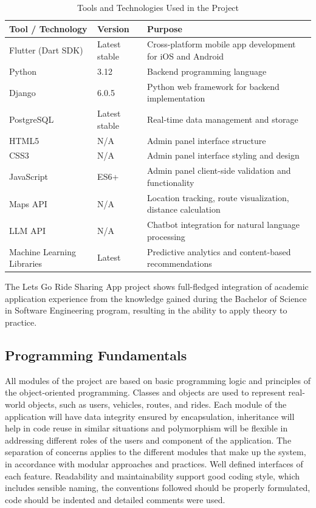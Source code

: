 \begin{table}[htbp]
\centering
\caption{Tools and Technologies Used in the Project}
\renewcommand{\arraystretch}{1.3}
\begin{tabularx}{\textwidth}{|p{4cm}|p{3cm}|X|}
\hline
\textbf{Tool / Technology} & \textbf{Version} & \textbf{Purpose} \\
\hline
Flutter (Dart SDK) & Latest stable & Cross-platform mobile app development for iOS and Android \\
\hline
Python & 3.12 & Backend programming language \\
\hline
Django & 6.0.5 & Python web framework for backend implementation \\
\hline
PostgreSQL & Latest stable & Real-time data management and storage \\
\hline
HTML5 & N/A & Admin panel interface structure \\
\hline
CSS3 & N/A & Admin panel interface styling and design \\
\hline
JavaScript & ES6+ & Admin panel client-side validation and functionality \\
\hline
Maps API & N/A & Location tracking, route visualization, distance calculation \\
\hline
LLM API & N/A & Chatbot integration for natural language processing \\
\hline
Machine Learning Libraries & Latest & Predictive analytics and content-based recommendations \\
\hline
\end{tabularx}
\end{table}


The Lets Go Ride Sharing App project shows full-fledged integration of academic application experience from the knowledge gained during the Bachelor of Science in Software Engineering program, resulting in the ability to apply theory to practice.

\subsection{Programming Fundamentals}

All modules of the project are based on basic programming logic and principles of the object-oriented programming. Classes and objects are used to represent real-world objects, such as users, vehicles, routes, and rides. Each module of the application will have data integrity ensured by encapsulation, inheritance will help in code reuse in similar situations and polymorphism will be flexible in addressing different roles of the users and component of the application. The separation of concerns applies to the different modules that make up the system, in accordance with modular approaches and practices. Well defined interfaces of each feature. Readability and maintainability support good coding style, which includes sensible naming, the conventions followed should be properly formulated, code should be indented and detailed comments were used.


